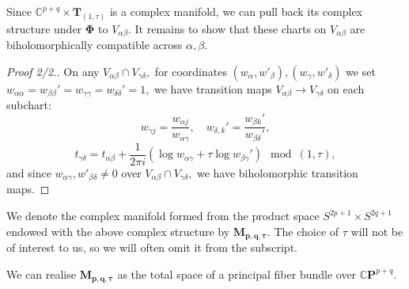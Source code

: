 Since $\mathbb{C}^{p+q}\times \mathbf{T}_{(1,\tau)}$ is a complex manifold, we can pull back its complex structure under $\mathbf{\Phi}$ to $V_{\alpha \beta}$. It remains to show that these charts on $V_{\alpha \beta}$ are biholomorphically compatible across $\alpha, \beta.$ 

\begin{proof}[Proof 2/2.]
On any $V_{\alpha \beta} \cap V_{\gamma \delta},$ for coordinates $(w_{\alpha}, w'_{\beta}), (w_{\gamma}, w'_{\delta})$ we set $w_{\alpha\alpha} = w_{\beta\beta}' =w_{\gamma\gamma} =w_{\delta\delta}' = 1,$ we have transition maps $V_{\alpha\beta}\rightarrow V_{\gamma\delta}$ on each subchart:
    \[
    w_{\gamma j} = \frac{w_{\alpha j}}{w_{\alpha \gamma}}, \quad w_{\delta, k}' = \frac{w_{\beta k}'}{w_{\beta \delta}'},
    \]
    \[
    t_{\gamma \delta} = t_{\alpha \beta} + \frac{1}{2\pi i} (\log w_{\alpha \gamma} + \tau \log w_{\beta \gamma}') \mod(1,\tau), \label{eq:str}\tag{III}
    \]
    and since $w_{\alpha \gamma}, w'_{\beta \delta} \neq 0$ over $V_{\alpha \beta}\cap V_{\gamma \delta},$ we have biholomorphic transition maps.
\end{proof}

We denote the complex manifold formed from the product space $S^{2p+1}\times S^{2q+1}$ endowed with the above complex structure by $\mathbf{M_{p,q, \tau}}.$ The choice of $\tau$ will not be of interest to us, so we will often omit it from the subscript.

\begin{theorem}
    We can realise $\mathbf{M_{p,q,\tau}}$ as the total space of a principal fiber bundle over $\mathbb{C}\mathbf{P}^{p+q}.$
\end{theorem}

